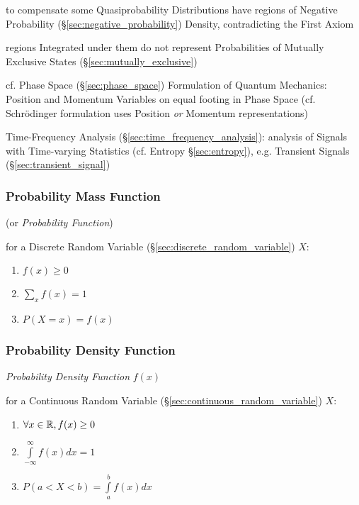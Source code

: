 to compensate some Quasiprobability Distributions have regions of Negative
Probability (\S\ref{sec:negative_probability}) Density, contradicting the First
Axiom

regions Integrated under them do not represent Probabilities of Mutually
Exclusive States (\S\ref{sec:mutually_exclusive})

cf. Phase Space (\S\ref{sec:phase_space}) Formulation of Quantum Mechanics:
Position and Momentum Variables on equal footing in Phase Space (cf.
Schr\"odinger formulation uses Position \emph{or} Momentum representations)

\fist Time-Frequency Analysis (\S\ref{sec:time_frequency_analysis}): analysis
of Signals with Time-varying Statistics (cf. Entropy \S\ref{sec:entropy}), e.g.
Transient Signals (\S\ref{sec:transient_signal})



\subsubsection{Probability Mass Function}\label{sec:probability_mass}

(or \emph{Probability Function})

for a Discrete Random Variable (\S\ref{sec:discrete_random_variable})
$X$:
\begin{enumerate}
  \item $f(x) \geq 0$
  \item $\sum_x f(x) = 1$
  \item $P(X = x) = f(x)$
\end{enumerate}



\subsubsection{Probability Density Function}
\label{sec:probability_density}

\emph{Probability Density Function} $f(x)$

for a Continuous Random Variable
(\S\ref{sec:continuous_random_variable}) $X$:
\begin{enumerate}
  \item $\forall x \in \mathbb{R}, f(x) \geq 0$
  \item $\int\limits_{-\infty}^{\infty} f(x) dx = 1$
  \item $P (a < X < b) = \int\limits_a^b f(x) dx$
\end{enumerate}



